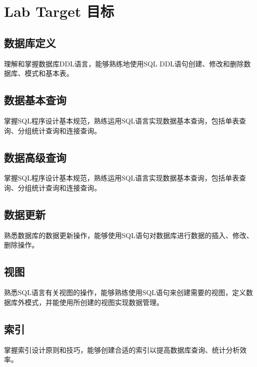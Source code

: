 \section{Lab Target 目标}
\subsection{数据库定义}
理解和掌握数据库DDL语言，能够熟练地使用SQL DDL语句创建、修改和删除数据库、模式和基本表。
\subsection{数据基本查询}
掌握SQL程序设计基本规范，熟练运用SQL语言实现数据基本查询，包括单表查询、分组统计查询和连接查询。
\subsection{数据高级查询}
掌握SQL程序设计基本规范，熟练运用SQL语言实现数据基本查询，包括单表查询、分组统计查询和连接查询。
\subsection{数据更新}
熟悉数据库的数据更新操作，能够使用SQL语句对数据库进行数据的插入、修改、删除操作。
\subsection{视图}
熟悉SQL语言有关视图的操作，能够熟练使用SQL语句来创建需要的视图，定义数据库外模式，并能使用所创建的视图实现数据管理。 
\subsection{索引}
掌握索引设计原则和技巧，能够创建合适的索引以提高数据库查询、统计分析效率。 